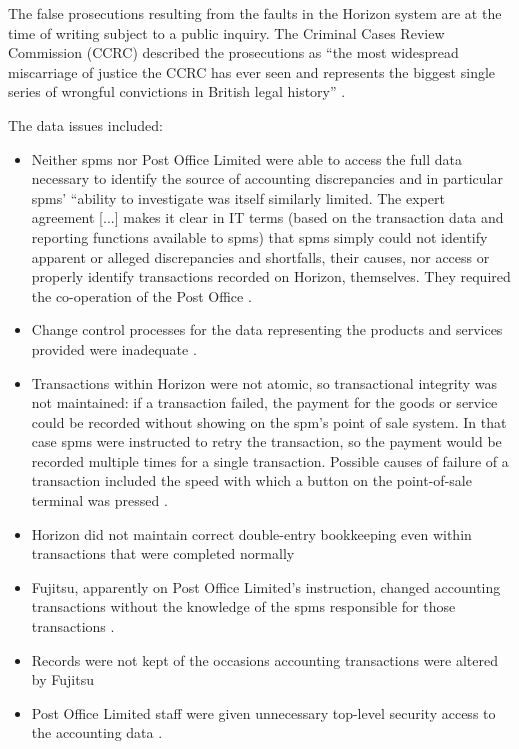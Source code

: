 The false prosecutions resulting from the faults in the Horizon system are at the time of writing subject to a public inquiry. The Criminal Cases Review Commission (CCRC) described the prosecutions as ``the most widespread miscarriage of justice the CCRC has ever seen and represents the biggest single series of wrongful convictions in British legal history''  \cite{citation:horizon_ccrc}.

The data issues included:
\begin{itemize}
	\item Neither \glspl{spm} nor Post Office Limited were able to access the full data necessary to identify the source of accounting discrepancies \cite[]{citation:bates_v_pol} and in particular \glspl{spm}' ``ability to
	investigate was itself similarly limited. The expert agreement [...]
	makes it clear in IT terms (based on the transaction data and reporting functions
	available to \glspl{spm}) that \glspl{spm} simply could not identify apparent or alleged
	discrepancies and shortfalls, their causes, nor access or properly identify transactions
	recorded on Horizon, themselves. They required the co-operation of the Post Office \cite[]{citation:bates_v_pol}.
	\item Change control processes for the data representing the products and services provided were inadequate \cite[]{citation:bates_v_pol_tech}.
	\item Transactions within Horizon were not atomic, so transactional \gls{integrity} was not maintained: if a transaction failed, the payment for the goods or service could be recorded without showing on the \gls{spm}'s point of sale system. In that case \glspl{spm} were instructed to retry the transaction, so the payment would be recorded multiple times for a single transaction. Possible causes of failure of a transaction included the speed with which a button on the point-of-sale terminal was pressed \cite[]{citation:bates_v_pol}.
	\item Horizon did not maintain correct double-entry bookkeeping even within transactions that were completed normally \cite[\textsection 128ff]{citation:bates_v_pol_tech}
	\item Fujitsu, apparently on Post Office Limited's instruction, changed accounting transactions without the knowledge of the \glspl{spm} responsible for those transactions \cite[]{citation:bates_v_pol_tech}.
	\item Records were not kept of the occasions accounting transactions were altered by Fujitsu \cite[, ]{citation:bates_v_pol}
	\item Post Office Limited staff were given unnecessary top-level security access to the accounting data \cite[]{citation:bates_v_pol}.
\end{itemize}
